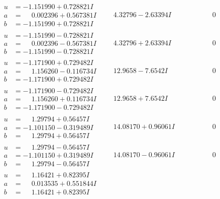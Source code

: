 \documentclass[1p]{elsarticle_modified}
\theoremstyle{definition}
\begin{document}
$$\begin{array}{c|c|c}
\begin{aligned}
u &= -1.151990 + 0.728821 I \\
a &= \phantom{-}0.002396 + 0.567381 I \\
b &= -1.151990 + 0.728821 I\end{aligned}
 & \phantom{-}4.32796 - 2.63394 I & \phantom{-0.000000 } 0 \\ \hline\begin{aligned}
u &= -1.151990 - 0.728821 I \\
a &= \phantom{-}0.002396 - 0.567381 I \\
b &= -1.151990 - 0.728821 I\end{aligned}
 & \phantom{-}4.32796 + 2.63394 I & \phantom{-0.000000 } 0 \\ \hline\begin{aligned}
u &= -1.171900 + 0.729482 I \\
a &= \phantom{-}1.156260 - 0.116734 I \\
b &= -1.171900 + 0.729482 I\end{aligned}
 & \phantom{-}12.9658 - 7.6542 I & \phantom{-0.000000 } 0 \\ \hline\begin{aligned}
u &= -1.171900 - 0.729482 I \\
a &= \phantom{-}1.156260 + 0.116734 I \\
b &= -1.171900 - 0.729482 I\end{aligned}
 & \phantom{-}12.9658 + 7.6542 I & \phantom{-0.000000 } 0 \\ \hline\begin{aligned}
u &= \phantom{-}1.29794 + 0.56457 I \\
a &= -1.101150 - 0.319489 I \\
b &= \phantom{-}1.29794 + 0.56457 I\end{aligned}
 & \phantom{-}14.08170 + 0.96061 I & \phantom{-0.000000 } 0 \\ \hline\begin{aligned}
u &= \phantom{-}1.29794 - 0.56457 I \\
a &= -1.101150 + 0.319489 I \\
b &= \phantom{-}1.29794 - 0.56457 I\end{aligned}
 & \phantom{-}14.08170 - 0.96061 I & \phantom{-0.000000 } 0 \\ \hline\begin{aligned}
u &= \phantom{-}1.16421 + 0.82395 I \\
a &= \phantom{-}0.013535 + 0.551844 I \\
b &= \phantom{-}1.16421 + 0.82395 I\end{aligned}

\end{array}$$
\end{document}
